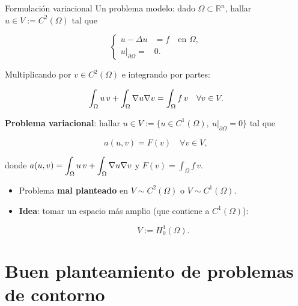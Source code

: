 \documentclass[10pt,leqno]{beamer}
\begin{document}
\begin{frame}{Formulación variacional}
  Un problema modelo: dado $\Omega\subset\mathbb{R}^n$, hallar
  $u\in V:=C^2(\Omega)$ tal que
  \begin{block}{}
    \vspace{-1.1ex}
    \begin{equation*}
      \left\{
        \label{eq:1}
        \begin{aligned}
          u - \Delta u &= f \quad\text{en } \Omega,  \\
          u | _{\partial\Omega} =& 0.
        \end{aligned}
      \right.
    \end{equation*}
  \end{block}
  Multiplicando por $v\in C^2(\Omega)$ e integrando por partes:
  \begin{block}{}
    \vspace{-1.1ex}
    \begin{equation*}
      \label{eq:2}
      \int_\Omega u\,v + \int_\Omega\nabla u \nabla v = \int_\Omega f\,v
      \quad\forall v\in V.
    \end{equation*}
  \end{block}
  \textbf{Problema variacional}: hallar
  $u\in V:= \{u\in C^1(\Omega),\ u|_{\partial\Omega}=0\}$ tal que
  \begin{block}{}
    \vspace{-2.9ex}
    \begin{equation}
      \label{eq:pb.variacional}
      \tag{P}
    a(u,v)= F(v) \quad \forall v \in V,
  \end{equation}
  \end{block}
  \vspace{1ex} donde
  $\displaystyle a(u,v)=\int_\Omega u\,v + \int_\Omega\nabla u \nabla v$
  \quad y \quad $\displaystyle F(v) = \int_\Omega f\,v$.
  \begin{itemize}
  \item Problema \textbf{mal planteado} en $V\sim C^2(\Omega)$ o
    $V \sim C^1(\Omega)$.
  \item \textbf{Idea}: tomar un espacio más amplio (que contiene a $C^1(\Omega)$):
  \begin{block}{}
    \vspace{-1ex}
    $$
    V:=H_0^1(\Omega).
    $$
  \end{block}
\end{itemize}
\end{frame}

\section{Buen planteamiento de problemas de contorno}
\label{sec:buen-plant-de}
\end{document}

